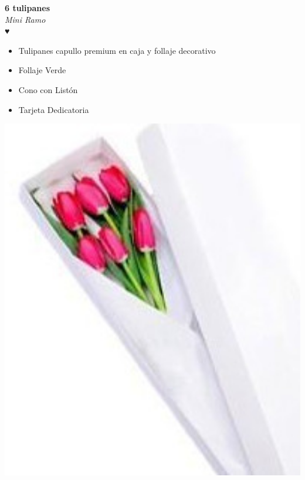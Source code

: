 \documentclass{article}
\begin{document}
\vspace{1cm}
\noindent
\begin{minipage}{0.6\textwidth}
    \textcolor{cpred}{\textbf{\huge 6 tulipanes }}\\
    {\textit{Mini Ramo}} \\
    \textcolor{cpred}{\Huge ♥} \\
    \vspace{0.5cm}
    \begin{itemize}
        \item Tulipanes capullo premium en caja y follaje decorativo
        \item Follaje Verde
        \item Cono con Listón
        \item Tarjeta Dedicatoria
    \end{itemize}
\end{minipage}
\hspace{1cm}
\begin{minipage}{0.35\textwidth}
    \includegraphics[width=1.0\textwidth]{imagenes_extraidas/image_2_5}
\end{minipage}
\end{document}
